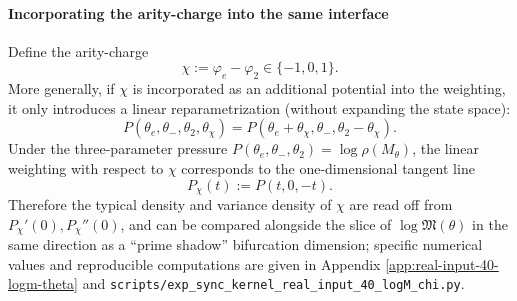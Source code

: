 \paragraph{Incorporating the arity-charge into the same interface}
Define the arity-charge
\[
\chi:=\varphi_e-\varphi_2\in\{-1,0,1\}.
\]
More generally, if $\chi$ is incorporated as an additional potential into the weighting, it only introduces a linear reparametrization (without expanding the state space):
\[
P(\theta_e,\theta_-,\theta_2,\theta_\chi)=P(\theta_e+\theta_\chi,\theta_-,\theta_2-\theta_\chi).
\]
Under the three-parameter pressure $P(\theta_e,\theta_-,\theta_2)=\log\rho(M_\theta)$, the linear weighting with respect to $\chi$ corresponds to the one-dimensional tangent line
\[
P_\chi(t):=P(t,0,-t).
\]
Therefore the typical density and variance density of $\chi$ are read off from
\(
P_\chi'(0),P_\chi''(0)
\),
and can be compared alongside the slice of $\log\mathfrak{M}(\theta)$ in the same direction as a ``prime shadow'' bifurcation dimension; specific numerical values and reproducible computations are given in Appendix \ref{app:real-input-40-logm-theta} and
\texttt{scripts/exp\_sync\_kernel\_real\_input\_40\_logM\_chi.py}.

